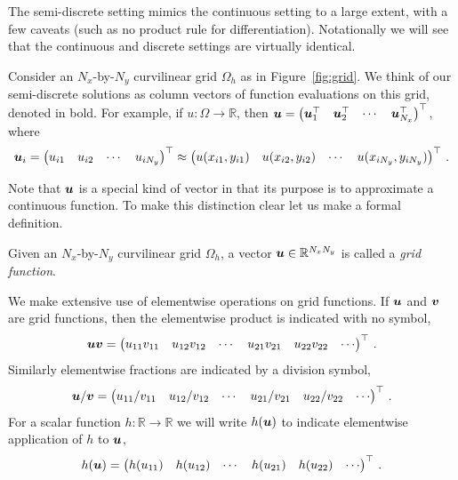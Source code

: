 The semi-discrete setting mimics the continuous setting to a large extent, with a few caveats (such as no product rule for differentiation). Notationally we will see that the continuous and discrete settings are virtually identical.

Consider an $N_x$-by-$N_y$ curvilinear grid $\Omega_h$ as in Figure~\ref{fig:grid}. We think of our semi-discrete solutions as column vectors of function evaluations on this grid, denoted in bold. For example, if
$
  u : \Omega \to \mathbb{R}
$,
then
$
  \bm{u} =
  \begin{pmatrix}
    \bm{u}_1^\top & \bm{u}_2^\top & \cdots & \bm{u}_{N_x}^\top
  \end{pmatrix}^\top
$,
where
\[
  \bm{u}_i =
  \begin{pmatrix}
    u_{i1} & u_{i2} & \cdots & u_{iN_y}
  \end{pmatrix}^\top
  \approx
  \begin{pmatrix}
    u(x_{i1}, y_{i1}) & u(x_{i2}, y_{i2}) & \cdots & u(x_{iN_y}, y_{iN_y})
  \end{pmatrix}^\top \,.
\]

Note that $\bm{u}$ is a special kind of vector in that its purpose is to approximate a continuous function. To make this distinction clear let us make a formal definition.

\begin{definition}
  Given an $N_x$-by-$N_y$ curvilinear grid $\Omega_h$, a vector $\bm{u} \in \mathbb{R}^{N_x N_y}$ is called a \emph{grid function}.
\end{definition}

We make extensive use of elementwise operations on grid functions. If $\bm{u}$ and $\bm{v}$ are grid functions, then the elementwise product is indicated with no symbol,
\begin{equation*}
  \bm{u}\bm{v} =
  \begin{pmatrix}
    u_{11}v_{11} & u_{12}v_{12} & \cdots & u_{21}v_{21} & u_{22}v_{22} & \cdots
  \end{pmatrix}^\top \,.
\end{equation*}
Similarly elementwise fractions are indicated by a division symbol,
\begin{equation*}
  \bm{u}/\bm{v} =
  \begin{pmatrix}
    u_{11}/v_{11} & u_{12}/v_{12} & \cdots & u_{21}/v_{21} & u_{22}/v_{22} & \cdots
  \end{pmatrix}^\top \,.
\end{equation*}
For a scalar function $h : \mathbb{R} \to \mathbb{R}$ we will write $h(\bm{u})$ to indicate elementwise application of $h$ to $\bm{u}$,
\begin{equation*}
  h(\bm{u}) =
  \begin{pmatrix}
    h(u_{11}) & h(u_{12}) & \cdots & h(u_{21}) & h(u_{22}) & \cdots
  \end{pmatrix}^\top \,.
\end{equation*}

